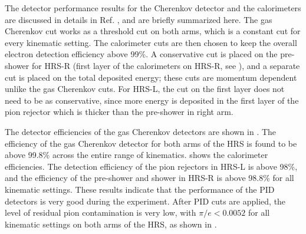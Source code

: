 The detector performance results for the Cherenkov detector and the calorimeters are discussed in details in Ref. \cite{Cummings2013}, and are briefly summarized here. The gas Cherenkov cut works as a threshold cut on both arms, which is a constant cut for every kinematic setting. The calorimeter cuts are then chosen to keep the overall electron detection efficiency above 99\%. A conservative cut is placed on the pre-shower for HRS-R (first layer of the calorimeters on HRS-R, see ), and a separate cut is placed on the total deposited energy; these cuts are momentum dependent unlike the gas Cherenkov cuts. For HRS-L, the cut on the first layer does not need to be as conservative, since more energy is deposited in the first layer of the pion rejector which is thicker than the pre-shower in right arm.

The detector efficiencies of the gas Cherenkov detectors are shown in . The efficiency of the gas Cherenkov detector for both arms of the HRS is found to be above 99.8\% across the entire range of kinematics.  shows the calorimeter efficiencies. The detection efficiency of the pion rejectors in HRS-L is above 98\%, and the efficiency of the pre-shower and shower in HRS-R is above 98.8\% for all kinematic settings. These results indicate that the performance of the PID detectors is very good during the experiment. After PID cuts are applied, the level of residual pion contamination is very low, with $\pi/e<0.0052$ for all kinematic settings on both arms of the HRS, as shown in .

